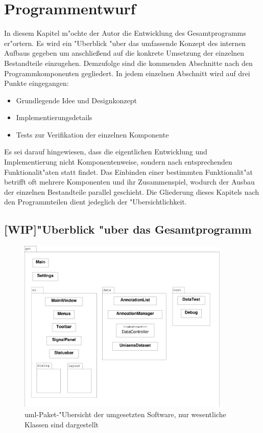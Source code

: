 \chapter{Programmentwurf}
\label{chap:entwurf}

In diesem Kapitel m"ochte der Autor die Entwicklung des Gesamtprogramms er"ortern.
Es wird ein "Uberblick "uber das umfassende Konzept des internen Aufbaus gegeben um anschlie\ss end auf die konkrete Umsetzung der einzelnen Bestandteile einzugehen.
Demzufolge sind die kommenden Abschnitte nach den Programmkomponenten gegliedert.
In jedem einzelnen Abschnitt wird auf drei Punkte eingegangen:
\begin{itemize}
	\item Grundlegende Idee und Designkonzept
	\item Implementierungsdetails
	\item Tests zur Verifikation der einzelnen Komponente
\end{itemize}
Es sei darauf hingewiesen, dass die eigentlichen Entwicklung und Implementierung nicht Komponentenweise, sondern nach entsprechenden Funktionalit"aten statt findet.
Das Einbinden einer bestimmten Funktionalit"at betrifft oft mehrere Komponenten und ihr Zusammenspiel, wodurch der Ausbau der einzelnen Bestandteile parallel geschieht.
Die Gliederung dieses Kapitels nach den Programmteilen dient jedeglich der "Ubersichtlichkeit.

\section{[WIP]"Uberblick "uber das Gesamtprogramm}

\begin{figure}[htb]
\centering
\includegraphics[width=0.9\textwidth]{bilder/prog_ubersicht.eps}
\caption[\ac{uml}-Paket-"Ubersicht der umgesetzten Software]{\ac{uml}-Paket-"Ubersicht der umgesetzten Software, nur wesentliche Klassen sind dargestellt}
\label{pic:paket_ubersicht}
\end{figure}

